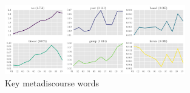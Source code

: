 \begin{figure}[htb]
    \begin{center}
    \includegraphics[width=0.70\textwidth]{../images/subplot-metad.png}
    \end{center}
    \caption{Key metadiscourse words}
    \label{fig:metadiscourse}
    \end{figure}


